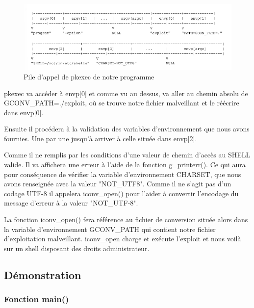 \documentclass[12pt,a4paper]{article}
\begin{document}
\begin{flushleft}
\begin{enumerate}
            \end{enumerate}
            \begin{center}
                \begin{figure}
                    \caption{Pile d'appel de pkexec de notre programme \cite{CVE2021425:online}}
                    \includegraphics[scale=0.5]{pile d'appel programme final} 
                 \end{figure}
            \end{center}
            \item pkexec va accéder à envp[0] et comme vu au dessus, va aller au chemin absolu de GCONV\_PATH=./exploit, où se trouve notre fichier malveillant et le réécrire dans envp[0].
            \item Ensuite il procédera à la validation des variables d'environnement que nous avons fournies. Une par une jusqu'à arriver à celle située dans envp[2].
            \item Comme il ne remplis par les conditions d'une valeur de chemin d'accès au SHELL valide. Il va affichera une erreur à l'aide de la fonction g\_printerr(). Ce qui aura pour conséquence de vérifier la variable d'environnement CHARSET, que nous avons renseignée avec la valeur "NOT\_UTF8". Comme il ne s'agit pas d'un codage UTF-8 il appelera iconv\_open() pour l'aider à convertir l'encodage du message d'erreur à la valeur "NOT\_UTF-8".
            \item La fonction iconv\_open() fera référence au fichier de conversion située alors dans la variable d'environnement GCONV\_PATH qui contient notre fichier d'exploitation malveillant. iconv\_open charge et exécute l'exploit et nous voilà sur un shell disposant des droits administrateur.

    \end{flushleft}
       \newpage

   		\subsection{Démonstration}
			\subsubsection{Fonction main()} 
			  
\end{document}

